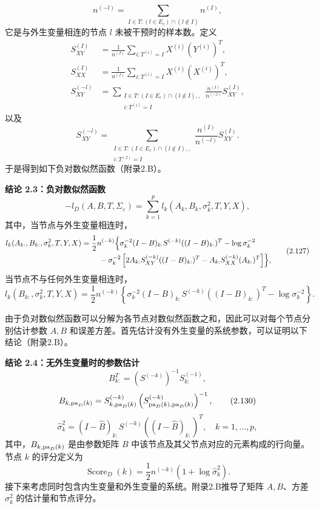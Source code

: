 \[
n^{(-l)}=\sum_{I\in T:(l\in E_c)\cap(l\notin I)}n^{(I)},
\]
它是与外生变量相连的节点 $l$ 未被干预时的样本数。定义
\[
\begin{aligned}
S_{XY}^{(I)}&=\frac1{n^{(I)}}\sum_{i:T^{(i)}=I}X^{(i)}(Y^{(i)})^T,\\
S_{XX}^{(I)}&=\frac1{n^{(I)}}\sum_{i:T^{(i)}=I}X^{(i)}(X^{(i)})^T,\\
S_{XY}^{(-l)}&=
\sum_{\substack{I\in T:(I\in E_c)\cap(l\notin I),,\\i:T^{(i)}=I}}
\frac{n^{(I)}}{n^{(-l)}}S_{XY}^{(I)},
\end{aligned}
\]
以及
\[
S_{XY}^{(-l)}=
\sum_{\substack{I\in T:(I\in E_c)\cap(l\notin I),,\\i:T^{(I)}=I}}
\frac{n^{(I)}}{n^{(-l)}}S_{XY}^{(I)}.
\]
于是得到如下负对数似然函数（附录2.B）。

\par\medskip\noindent\textbf{结论 2.3：负对数似然函数}\quad
\begin{equation}
-l_D(A,B,T,\Sigma_\varepsilon)
=\sum_{k=1}^{p}l_k(A_k,B_k,\sigma_k^2,T,Y,X),
\tag{2.126}
\end{equation}
其中，当节点与外生变量相连时，
\begin{equation}
\begin{aligned}
l_k(A_{k:},B_{k:},\sigma_k^2,T,Y,X)
={}&\frac12n^{(-k)}\Bigl\{
\sigma_k^{-2}(I-B)_{k:}S^{(-k)}((I-B)_{k:})^T-\log\sigma_k^{-2}\\
&\quad-\sigma_k^{-2}
\left[2A_{k:}S_{XY}^{(-k)}((I-B)_{k:})^T
-A_{k:}S_{XX}^{(-k)}(A_{k:})^T\right]\Bigr\},
\end{aligned}\tag{2.127}
\end{equation}
当节点不与任何外生变量相连时，
\begin{equation}
l_k(B_{k:},\sigma_k^2,T,Y,X)
=\frac12n^{(-k)}
\left\{\sigma_k^{-2}(I-B)_{k:}S^{(-k)}((I-B)_{k:})^T
-\log\sigma_k^{-2}\right\}.
\tag{2.128}
\end{equation}

由于负对数似然函数可以分解为各节点对数似然函数之和，因此可以对每个节点分别估计参数 $A,B$ 和误差方差。首先估计没有外生变量的系统参数，可以证明以下结论（附录2.B）。

\par\medskip\noindent\textbf{结论 2.4：无外生变量时的参数估计}\quad
\begin{equation}
B_{k:}^{T}=(S^{(-k)})^{-1}S_{k:}^{(-1)},
\tag{2.129}
\end{equation}
\begin{equation}
B_{k,\mathrm{pa}_D(k)}
=S_{k,\mathrm{pa}_D(k)}^{(-k)}
\left(S_{\mathrm{pa}_D(k),\mathrm{pa}_D(k)}^{(-k)}\right)^{-1},
\tag{2.130}
\end{equation}
\begin{equation}
\widehat\sigma_k^2
=(I-\widehat B)_{k:}S^{(-k)}
\left((I-\widehat B)_{k:}\right)^T,\quad k=1,\ldots,p,
\tag{2.131}
\end{equation}
其中，$B_{k,\mathrm{pa}_D(k)}$ 是由参数矩阵 $B$ 中该节点及其父节点对应的元素构成的行向量。节点 $k$ 的评分定义为
\begin{equation}
\operatorname{Score}_D(k)=\frac12n^{(-k)}(1+\log\widehat\sigma_k^2).
\tag{2.132}
\end{equation}
接下来考虑同时包含内生变量和外生变量的系统。附录2.B推导了矩阵 $A,B$、方差 $\sigma_k^2$ 的估计量和节点评分。

